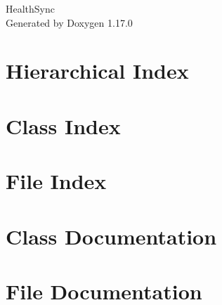 \documentclass[twoside]{book}
\newcommand{\+}{\discretionary{\mbox{\scriptsize$\hookleftarrow$}}{}{}}
\newcommand{\clearemptydoublepage}{%
    \newpage{\pagestyle{empty}\cleardoublepage}%
  }
\begin{document}
  \raggedbottom
    \hypersetup{pageanchor=false,
                bookmarksnumbered=true,
                pdfencoding=unicode
               }
  \begin{titlepage}
  \vspace*{7cm}
  \begin{center}%
  {\Large Health\+Sync}\\
  \vspace*{1cm}
  {\large Generated by Doxygen 1.17.0}\\
  \end{center}
  \end{titlepage}
  \clearemptydoublepage
  \tableofcontents
  \clearemptydoublepage
  \hypersetup{pageanchor=true}

\chapter{Hierarchical Index}

\chapter{Class Index}

\chapter{File Index}

\chapter{Class Documentation}








\chapter{File Documentation}




















  \backmatter
  \newpage
  \clearemptydoublepage
  \printindex
\end{document}
